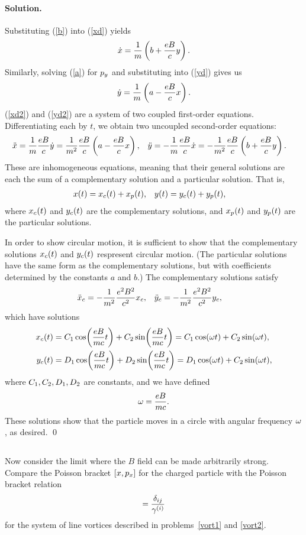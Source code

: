 \documentclass[11pt]{article}
\newcommand{\refeq}[1]{(\ref{#1})}
\newcommand{\beq}{\begin{equation*}}
\newcommand{\eeq}{\end{equation*}}
\newcommand{\beqn}{\begin{equation}}
\newcommand{\eeqn}{\end{equation}}
\newenvironment{problem}
{
	\subsection{}
	\color{darkgray}
    \ignorespaces
}
{

}
\newenvironment{solution}
{
    \paragraph{Solution.}
    \ignorespaces
}
{
    \bigskip
}
\begin{document}
\begin{solution}
	Substituting \refeq{b} into \refeq{xd} yields
	\beqn \label{xd2}
		\xd = \frac{1}{m} \left( b + \frac{e B}{c} y \right).
	\eeqn
	Similarly, solving \refeq{a} for $p_y$ and substituting into \refeq{yd} gives us
	\beqn \label{yd2}
		\yd = \frac{1}{m} \left( a - \frac{e B}{c} x \right).
	\eeqn
	\refeq{xd2} and \refeq{yd2} are a system of two coupled first-order equations.  Differentiating each by $t$, we obtain two uncoupled second-order equations:
	\begin{align*}
		\ddot{x} &= \frac{1}{m} \frac{e B}{c} \dot{y}
		= \frac{1}{m^2} \frac{e B}{c} \left( a - \frac{e B}{c} x \right), &
		\ddot{y} &= -\frac{1}{m} \frac{e B}{c} \dot{x}
		= -\frac{1}{m^2} \frac{e B}{c} \left( b + \frac{e B}{c} y \right).
	\end{align*}
	These are inhomogeneous equations, meaning that their general solutions are each the sum of a complementary solution and a particular solution.  That is,
	\begin{align*}
		x(t) &= x_c(t) + x_p(t), &
		y(t) &= y_c(t) + y_p(t),
	\end{align*}
	where $x_c(t)$ and $y_c(t)$ are the complementary solutions, and $x_p(t)$ and $y_p(t)$ are the particular solutions.
	
	In order to show circular motion, it is sufficient to show that the complementary solutions $x_c(t)$ and $y_c(t)$ respresent circular motion.  (The particular solutions have the same form as the complementary solutions, but with coefficients determined by the constants $a$ and $b$.)  The complementary solutions satisfy
	\begin{align*}
		\ddot{x}_c &= -\frac{1}{m^2} \frac{e^2 B^2}{c^2} x_c, &
		\ddot{y}_c &= -\frac{1}{m^2} \frac{e^2 B^2}{c^2} y_c,
	\end{align*}
	which have solutions
	\begin{align*}
		x_c(t) &= C_1 \cos(\frac{e B}{m c} t) + C_2 \sin(\frac{e B}{m c} t)
		= C_1 \cos(\omega t) + C_2 \sin(\omega t), \\
		y_c(t) &= D_1 \cos(\frac{e B}{m c} t) + D_2 \sin(\frac{e B}{m c} t)
		= D_1 \cos(\omega t) + C_2 \sin(\omega t),
	\end{align*}
	where $C_1, C_2, D_1, D_2$ are constants, and we have defined
	\beq
		\omg = \frac{e B}{m c}.
	\eeq
	These solutions show that the particle moves in a circle with angular frequency $\omega$, as desired. \qed
\end{solution}

\begin{problem}
	Now consider the limit where the $B$ field can be made arbitrarily strong.  Compare the Poisson bracket $[x, p_x]$ for the charged particle with the Poisson bracket relation
	\beq
		[\xi, \yi] = \frac{\delta_{ij}}{\gami}
	\eeq
	for the system of line vortices described in problems~\ref{vort1} and \ref{vort2}.
\end{problem}
\end{document}
